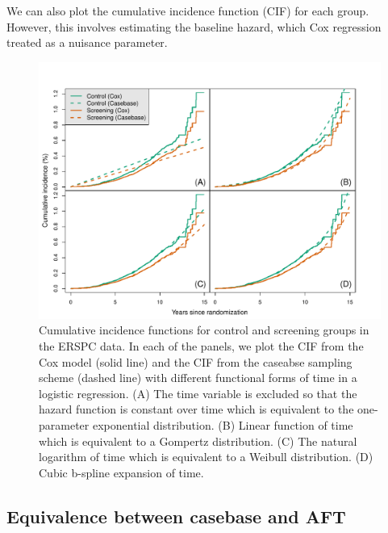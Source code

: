 \documentclass[
]{jss}
\begin{document}
We can also plot the cumulative incidence function (CIF) for each group.
However, this involves estimating the baseline hazard, which Cox
regression treated as a nuisance parameter.

\begin{CodeChunk}
\begin{figure}

{\centering \includegraphics{../figures/erspc-cox-cif-1} 

}

\caption[Cumulative incidence functions for control and screening groups in the ERSPC data]{Cumulative incidence functions for control and screening groups in the ERSPC data. In each of the panels, we plot the CIF from the Cox model (solid line) and the CIF from the caseabse sampling scheme (dashed line) with different functional forms of time in a logistic regression. (A) The time variable is excluded so that the hazard function is constant over time which is equivalent to the one-parameter exponential distribution. (B) Linear function of time which is equivalent to a Gompertz distribution. (C) The natural logarithm of time which is equivalent to a Weibull distribution. (D) Cubic b-spline expansion of time.}\label{fig:erspc-cox-cif}
\end{figure}
\end{CodeChunk}

\hypertarget{equivalence-between-casebase-and-aft}{%
\subsection{Equivalence between casebase and
AFT}\label{equivalence-between-casebase-and-aft}}
\end{document}
